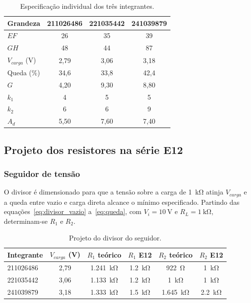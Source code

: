 \documentclass[11pt,a4paper]{article}
\begin{document}
\begin{table}[h]
\centering
\caption{Especificação individual dos três integrantes.}
\label{tab:individuais}
\begin{tabular}{lccc}
\hline
Grandeza & 211026486 & 221035442 & 241039879 \\
\hline
$EF$ & 26 & 35 & 39 \\
$GH$ & 48 & 44 & 87 \\
$V_{carga}$ (\si{\volt}) & 2,79 & 3,06 & 3,18 \\
Queda (\%) & 34,6 & 33,8 & 42,4 \\
$G$ & 4,20 & 9,30 & 8,80 \\
$k_1$ & 4 & 5 & 5 \\
$k_2$ & 6 & 6 & 9 \\
$A_d$ & 5,50 & 7,60 & 7,40 \\
\hline
\end{tabular}
\end{table}

\subsection{Projeto dos resistores na série E12}

\subsubsection{Seguidor de tensão}

O divisor é dimensionado para que a tensão sobre a carga de \SI{1}{\kilo\ohm} atinja $V_{carga}$ e a queda entre vazio e carga direta alcance o mínimo especificado. Partindo das equações~\eqref{eq:divisor_vazio} a~\eqref{eq:queda}, com $V_i = \SI{10}{\volt}$ e $R_L = \SI{1}{\kilo\ohm}$, determinam-se $R_1$ e $R_2$.

\begin{table}[h]
\centering
\caption{Projeto do divisor do seguidor.}
\label{tab:projeto_seguidor}
\begin{tabular}{lccccc}
\hline
Integrante & $V_{carga}$ (\si{\volt}) & $R_1$ teórico & $R_1$ E12 & $R_2$ teórico & $R_2$ E12 \\
\hline
211026486 & 2,79 & \SI{1,241}{\kilo\ohm} & \SI{1,2}{\kilo\ohm} & \SI{922}{\ohm} & \SI{1}{\kilo\ohm} \\
221035442 & 3,06 & \SI{1,133}{\kilo\ohm} & \SI{1,2}{\kilo\ohm} & \SI{1}{\kilo\ohm} & \SI{1}{\kilo\ohm} \\
241039879 & 3,18 & \SI{1,333}{\kilo\ohm} & \SI{1,5}{\kilo\ohm} & \SI{1,645}{\kilo\ohm} & \SI{2,2}{\kilo\ohm} \\
\hline
\end{tabular}
\end{table}
\end{document}
